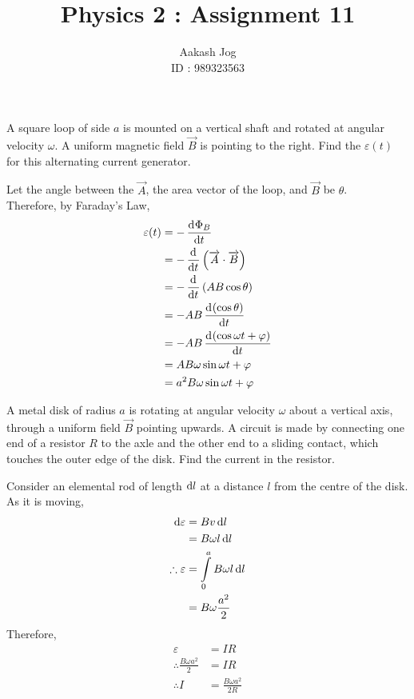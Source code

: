 \documentclass[fleqn, a4paper, 11pt, oneside]{amsart}
\title{Physics 2 : Assignment 11}
\author
{
	Aakash Jog\\
	ID : 989323563
}
\date{\formatdate{3}{6}{2015}}
\theoremstyle{definition}
\theoremstyle{theorem}
\begin{document}

\maketitle

\begin{question}
	A square loop of side $a$ is mounted on a vertical shaft and rotated at angular velocity $\omega$.
	A uniform magnetic field $\overrightarrow{B}$ is pointing to the right.
	Find the $\varepsilon(t)$ for this alternating current generator.
\end{question}

\begin{solution}
	Let the angle between the $\overrightarrow{A}$, the area vector of the loop, and $\overrightarrow{B}$ be $\theta$.\\
	Therefore, by Faraday's Law,
	\begin{align*}
		\varepsilon(t) &= -\dod{\Phi_B}{t}\\
		&= -\dod{}{t}\left( \overrightarrow{A} \cdot \overrightarrow{B} \right)\\
		&= -\dod{}{t}\left( A B \cos \theta \right)\\
		&= -A B \dod{(\cos \theta)}{t}\\
		&= -A B \dod{(\cos \omega t + \varphi)}{t}\\
		&= A B \omega \sin \omega t + \varphi\\
		&= a^2 B \omega \sin \omega t + \varphi
	\end{align*}
\end{solution}

\begin{question}
	A metal disk of radius $a$ is rotating at angular velocity $\omega$ about a vertical axis, through a uniform field $\overrightarrow{B}$ pointing upwards.
	A circuit is made by connecting one end of a resistor $R$ to the axle and the other end to a sliding contact, which touches the outer edge of the disk.
	Find the current in the resistor.
\end{question}

\begin{solution}
	Consider an elemental rod of length $\dif l$ at a distance $l$ from the centre of the disk.\\
	As it is moving,
	\begin{align*}
		\dif \varepsilon &= B v \dif l\\
		&= B \omega l \dif l\\
		\therefore \varepsilon &= \int\limits_{0}^{a} B \omega l \dif l\\
		&= B \omega \frac{a^2}{2}
	\end{align*}
	Therefore,
	\begin{align*}
		\varepsilon &= I R\\
		\therefore \frac{B \omega a^2}{2} &= I R\\
		\therefore I &= \frac{B \omega a^2}{2 R}
	\end{align*}
\end{solution}
\end{document}
